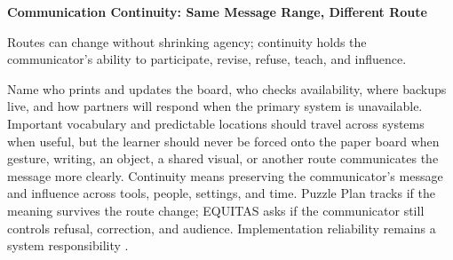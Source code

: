 \begin{center}
{\scriptsize\bfseries\color{DeepNavy}
Communication Continuity: Same Message Range, Different Route}

\vspace{-0.2cm}
{\scriptsize \par Routes can change without shrinking agency; continuity holds the communicator's ability to participate, revise, refuse, teach, and influence.}
\end{center}

Name who prints and updates the board, who checks availability, where backups live, and how partners will respond when the primary system is unavailable. Important vocabulary and predictable locations should travel across systems when useful, but the learner should never be forced onto the paper board when gesture, writing, an object, a shared visual, or another route communicates the message more clearly. Continuity means preserving the communicator's message and influence across tools, people, settings, and time. Puzzle Plan tracks if the meaning survives the route change; EQUITAS asks if the communicator still controls refusal, correction, and audience. Implementation reliability remains a system responsibility \citep{norrie2021context}.

